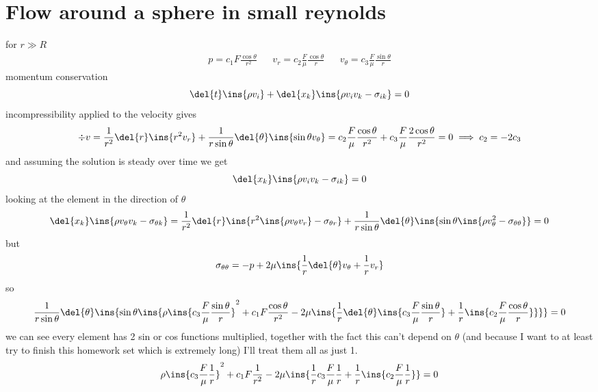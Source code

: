 \clearpage
\section{Flow around a sphere in small reynolds}
for \(r\gg R\)
\begin{align}
    p = c_1 F \frac{\cos\theta}{r^2} && v_r = c_2\frac{F}{\mu}\frac{\cos\theta}{r} && v_\theta = c_3 \frac{F}{\mu}\frac{\sin\theta}{r}
\end{align}
momentum conservation
\begin{equation}
    \del{t}\ins{\rho v_i}+\del{x_k}\ins{\rho v_i v_k -\sigma_{ik}}=0
\end{equation}
incompressibility applied to the velocity gives 
\begin{equation}
    \div{v}=\frac{1}{r^2}\del{r}\ins{r^2 v_r}+\frac{1}{r\sin\theta}\del{\theta}\ins{\sin\theta v_\theta} = c_2\frac{F}{\mu}\frac{\cos\theta}{r^2}+c_3\frac{F}{\mu}\frac{2\cos\theta}{r^2}=0\implies c_2 = -2c_3
\end{equation}
and assuming the solution is steady over time we get
\begin{equation}
    \del{x_k}\ins{\rho v_i v_k -\sigma_{ik}}=0
\end{equation}
looking at the element in the direction of \(\theta\)
\begin{equation}
    \del{x_k}\ins{\rho v_\theta v_k -\sigma_{\theta k}}=\frac{1}{r^2}\del{r}\ins{r^2\ins{\rho v_\theta v_r}-\sigma_{\theta r}}+\frac{1}{r\sin\theta}\del{\theta}\ins{\sin\theta\ins{\rho v_\theta^2-\sigma_{\theta\theta}}}=0
\end{equation}
but
\begin{equation}
    \sigma_{\theta\theta} = -p + 2\mu\ins{\frac{1}{r}\del{\theta}v_\theta + \frac{1}{r}v_r}
\end{equation}
so
\begin{equation}
    \frac{1}{r\sin\theta}\del{\theta}\ins{\sin\theta\ins{\rho \ins{c_3 \frac{F}{\mu}\frac{\sin\theta}{r}}^2+c_1 F \frac{\cos\theta}{r^2} - 2\mu\ins{\frac{1}{r}\del{\theta}\ins{c_3 \frac{F}{\mu}\frac{\sin\theta}{r}} + \frac{1}{r}\ins{c_2\frac{F}{\mu}\frac{\cos\theta}{r}}}}}=0
\end{equation}
we can see every element has 2 sin or cos functions multiplied, together with the fact this can't depend on \(\theta\) (and because I want to at least try to finish this homework set which is extremely long) I'll treat them all as just 1.
\begin{equation}
    \rho \ins{c_3 \frac{F}{\mu}\frac{1}{r}}^2+c_1 F \frac{1}{r^2} - 2\mu\ins{\frac{1}{r}c_3 \frac{F}{\mu}\frac{1}{r} + \frac{1}{r}\ins{c_2\frac{F}{\mu}\frac{1}{r}}}=0
\end{equation}
